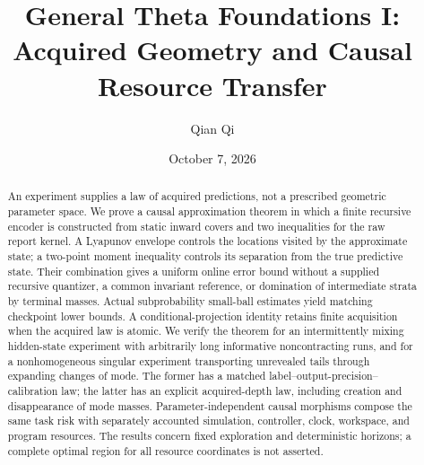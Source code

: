 \documentclass[11pt]{amsart}
\title[Acquired geometry and causal resource transfer]{General Theta Foundations I:\\Acquired Geometry and Causal Resource Transfer}
\author{Qian Qi}
\date{October 7, 2026}
\theoremstyle{definition}
\begin{document}
\begin{abstract}
An experiment supplies a law of acquired predictions, not a prescribed geometric parameter space. We prove a causal approximation theorem in which a finite recursive encoder is constructed from static inward covers and two inequalities for the raw report kernel. A Lyapunov envelope controls the locations visited by the approximate state; a two-point moment inequality controls its separation from the true predictive state. Their combination gives a uniform online error bound without a supplied recursive quantizer, a common invariant reference, or domination of intermediate strata by terminal masses. Actual subprobability small-ball estimates yield matching checkpoint lower bounds. A conditional-projection identity retains finite acquisition when the acquired law is atomic. We verify the theorem for an intermittently mixing hidden-state experiment with arbitrarily long informative noncontracting runs, and for a nonhomogeneous singular experiment transporting unrevealed tails through expanding changes of mode. The former has a matched label--output-precision--calibration law; the latter has an explicit acquired-depth law, including creation and disappearance of mode masses. Parameter-independent causal morphisms compose the same task risk with separately accounted simulation, controller, clock, workspace, and program resources. The results concern fixed exploration and deterministic horizons; a complete optimal region for all resource coordinates is not asserted.
\end{abstract}
\maketitle








\end{document}

